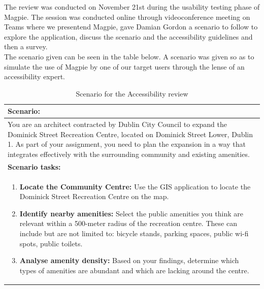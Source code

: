 \noindent The review was conducted on November 21st during the usability testing phase of Magpie. The session was conducted online through videoconference meeting on Teams where we presentend Magpie, gave Damian Gordon a scenario to follow to explore the application, discuss the scenario and the accessibility guidelines and then a survey.\\
The scenario given can be seen in the table below. A scenario was given so as to simulate the use of Magpie by one of our target users through the lense of an accessibility expert.
\begin{table}[h!]
    \centering
    \caption{Scenario for the Accessibility review}
    \begin{tabular}{|p{}|}
        \hline
        \textbf{Scenario:}                                                                                                                                                                                                                                                                                         \\
        \hline
        You are an architect contracted by Dublin City Council to expand the Dominick Street Recreation Centre, located on Dominick Street Lower, Dublin 1. As part of your assignment, you need to plan the expansion in a way that integrates effectively with the surrounding community and existing amenities. \\
        \hline
        \textbf{Scenario tasks:}                                                                                                                                                                                                                                                                                   \\
        \hline
        \begin{enumerate}
            \item \textbf{Locate the Community Centre:} Use the GIS application to locate the Dominick Street Recreation Centre on the map.
            \item \textbf{Identify nearby amenities:} Select the public amenities you think are relevant within a 500-meter radius of the recreation centre. These can include but are not limited to: bicycle stands, parking spaces, public wi-fi spots, public toilets.
            \item \textbf{Analyse amenity density:} Based on your findings, determine which types of amenities are abundant and which are lacking around the centre.

\end{enumerate}
\end{tabular}
\end{table}
